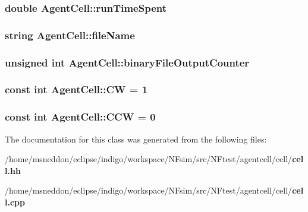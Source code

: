 \subsubsection{\setlength{\rightskip}{0pt plus 5cm}double {\bf AgentCell::runTimeSpent}\hspace{0.3cm}{\tt  [protected]}}\label{classAgentCell_9725a2452ae210e5a955f462424f6647}


\subsubsection{\setlength{\rightskip}{0pt plus 5cm}string {\bf AgentCell::fileName}\hspace{0.3cm}{\tt  [protected]}}\label{classAgentCell_4d90f8d3ef6d92bdcc80c08d4a5d76bd}


\subsubsection{\setlength{\rightskip}{0pt plus 5cm}unsigned int {\bf AgentCell::binaryFileOutputCounter}\hspace{0.3cm}{\tt  [protected]}}\label{classAgentCell_d85403763b8e5872fd2cc4b31dcca62a}


\subsubsection{\setlength{\rightskip}{0pt plus 5cm}const int {\bf AgentCell::CW} = 1\hspace{0.3cm}{\tt  [static, protected]}}\label{classAgentCell_8b0f52b3e8361e09cabc5300f74a2719}


\subsubsection{\setlength{\rightskip}{0pt plus 5cm}const int {\bf AgentCell::CCW} = 0\hspace{0.3cm}{\tt  [static, protected]}}\label{classAgentCell_1e87b6cbd25109779f464c82a7f92958}




The documentation for this class was generated from the following files:\begin{CompactItemize}
\item 
/home/msneddon/eclipse/indigo/workspace/NFsim/src/NFtest/agentcell/cell/{\bf cell.hh}\item 
/home/msneddon/eclipse/indigo/workspace/NFsim/src/NFtest/agentcell/cell/{\bf cell.cpp}\end{CompactItemize}
